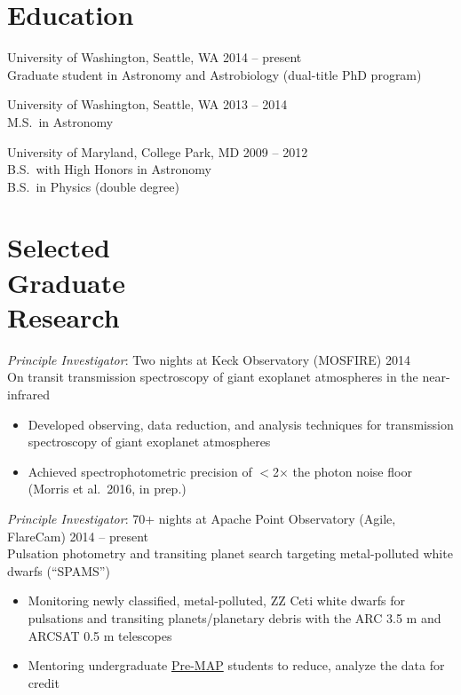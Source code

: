 \documentclass[margin]{res}
\begin{document}
\begin{resume}

\section{Education} 
University of Washington, Seattle, WA \hfill 2014 -- present\\
Graduate student in Astronomy and Astrobiology (dual-title PhD program)

University of Washington, Seattle, WA \hfill 2013 -- 2014\\
M.S.\ in Astronomy 

University of Maryland, College Park, MD  \hfill 2009 -- 2012\\
B.S.\ with High Honors in Astronomy \\
B.S.\ in Physics (double degree)\\

\section{Selected \\Graduate \\Research} 
{\sl Principle Investigator}: Two nights at Keck Observatory (MOSFIRE)   \hfill          2014\\
On transit transmission spectroscopy of giant exoplanet atmospheres in the near-infrared
\begin{itemize}  \itemsep -2pt %
\item Developed observing, data reduction, and analysis techniques for transmission spectroscopy of giant exoplanet atmospheres
\item Achieved spectrophotometric precision of $<$2$\times$ the photon noise floor  (Morris et al.~2016, in prep.)
\end{itemize}  

{\sl Principle Investigator}: 70+ nights at Apache Point Observatory (Agile, FlareCam) \hfill          2014 -- present\\
Pulsation photometry and transiting planet search targeting metal-polluted white dwarfs (``SPAMS'')
\begin{itemize}  \itemsep -1pt %
\item Monitoring newly classified, metal-polluted, ZZ Ceti white dwarfs for pulsations and transiting planets/planetary debris with the ARC 3.5 m and ARCSAT 0.5 m telescopes
\item Mentoring undergraduate \href{http://www.astro.washington.edu/users/premap/}{Pre-MAP} students to reduce, analyze the data for credit
\end{itemize}  


\end{resume}
\end{document}
